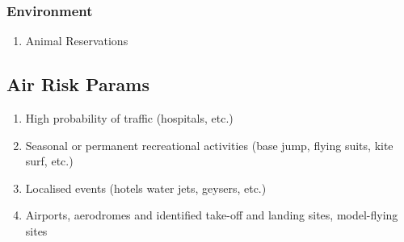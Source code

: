 \documentclass{ua_wgs_base}
\begin{document}
\subsubsection{Environment}
\begin{enumerate}
\item Animal Reservations
\end{enumerate}

\subsection{Air Risk Params}
\begin{enumerate}
\item High probability of traffic (hospitals, etc.) 
\item Seasonal or permanent recreational activities (base jump, flying suits,
kite surf, etc.) 
\item Localised events (hotels water jets, geysers, etc.)
\item Airports, aerodromes and identified take-off and landing sites, model-flying
sites
\end{enumerate}
\end{document}
